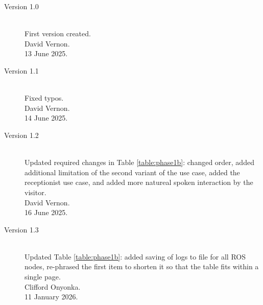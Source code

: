 \documentclass{CSSRforAfrica}
\begin{document}
\begin{description}

\item [Version 1.0]~\\
First version created. \\
David Vernon.\\
13 June 2025.                
 
\item [Version 1.1]~\\
Fixed typos. \\
David Vernon.\\
14 June 2025.  

\item [Version 1.2]~\\
Updated required changes in Table \ref{table:phase1b}: changed order, added additional limitation of the second variant of the use case, added the receptionist use case, and added more natureal spoken interaction by the visitor.\\
David Vernon.\\
16 June 2025. 

\item [Version 1.3]~\\
Updated Table \ref{table:phase1b}: added saving of logs to file for all ROS nodes, re-phrased the first item to shorten it so that the table fits within a single page.\\
Clifford Onyonka.\\
11 January 2026. 


\end{description}
\end{document}
